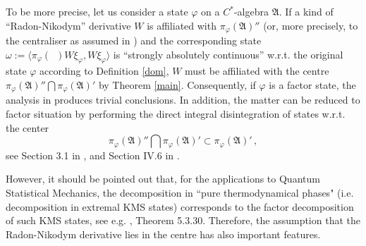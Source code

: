 \documentclass[12pt]{amsart}
\numberwithin{equation}{section}
\def\ga{{\mathfrak A}} \def\gpa{{\mathfrak a}}
\def\f{\varphi}\def\ff{\phi} \def\F{\Phi}
\def\om{\omega} \def\Om{\Omega}
\begin{document}
To be more precise, let us consider a state $\f$ on a $C^*$-algebra $\ga$. If a kind of ``Radon-Nikodym'' derivative $W$ is affiliated with 
$\pi_\f(\ga)''$ (or, more precisely, to the centraliser as assumed in \cite{PT})
and the corresponding state 
$\om:=\langle\pi_\f(\,\,\,)W\xi_\f,W\xi_\f\rangle$ is ``strongly absolutely continuous'' w.r.t. the original state $\f$ according to Definition
\ref{dom}, $W$ must be affiliated with 
the centre $\pi_\f(\ga)''\bigcap\pi_\f(\ga)'$ by Theorem \ref{main}. Consequently, if $\f$ is a factor state, the analysis in \cite{PT, S} produces trivial conclusions. In addition, the matter can be reduced to factor situation by performing the direct integral disintegration of states w.r.t. the center 
$$
\pi_\f(\ga)''\bigcap\pi_\f(\ga)'\subset \pi_\f(\ga)'\,, 
$$
see Section 3.1 in \cite{S}, and Section IV.6 in \cite{T}.

However, it should be pointed out that, for the applications to Quantum Statistical Mechanics, the decomposition in ``pure thermodynamical phases" (i.e. decomposition in extremal KMS states) corresponds to the factor decomposition of such KMS states, see e.g. \cite{BR}, Theorem 5.3.30. Therefore, the assumption that the Radon-Nikodym derivative lies in the centre has also important features. 
\end{document}
